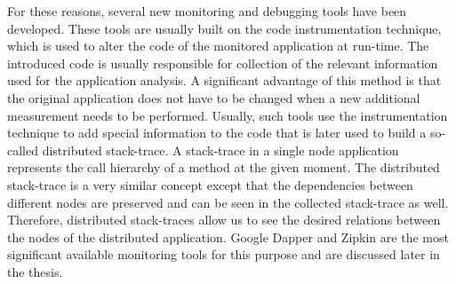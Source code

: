 For these reasons, several new monitoring and debugging tools have been developed. These tools are usually built on the code instrumentation technique, which is used to alter the code of the monitored application at run-time. The introduced code is usually responsible for collection of the relevant information used for the application analysis. A significant advantage of this method is that the original application does not have to be changed when a new additional measurement needs to be performed. Usually, such tools use the instrumentation technique to add special information to the code that is later used to build a so-called distributed stack-trace. A stack-trace in a single node application represents the call hierarchy of a method at the given moment. The distributed stack-trace is a very similar concept except that the dependencies between different nodes are preserved and can be seen in the collected stack-trace as well. Therefore, distributed stack-traces allow us to see the desired relations between the nodes of the distributed application. Google Dapper and Zipkin are the most significant available monitoring tools for this purpose and are discussed later in the thesis. 


